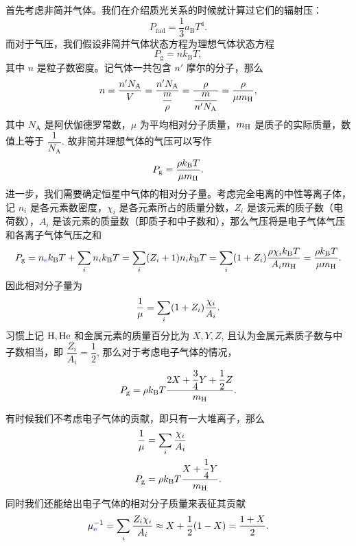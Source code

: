 \documentclass[../天体物理基础.tex]{subfiles}
\begin{document}
首先考虑非简并气体。我们在介绍质光关系的时候就计算过它们的辐射压：
\begin{equation}
P_{\mathrm{rad}}=\frac{1}{3}a_{\mathrm{B}}T^{4}.
\end{equation}
而对于气压，我们假设非简并气体状态方程为理想气体状态方程
\begin{equation}
P_{\mathrm{g}}=n{}k_{\mathrm{B}}T,
\end{equation}
其中 $n$ 是粒子数密度。记气体一共包含 $n'$ 摩尔的分子，那么
\begin{equation}
n=\frac{n'N_{\mathrm{A}}}{V}=\frac{n'N_{\mathrm{A}}}{\dfrac{m}{\rho}}=\frac{\rho}{\dfrac{m}{n'N_{\mathrm{A}}}}=\frac{\rho}{\mu m_{\ce{H}}},
\end{equation}
其中 $N_{\mathrm{A}}$ 是阿伏伽德罗常数，$\mu$ 为平均相对分子质量，$m_{\ce{H}}$ 是质子的实际质量，数值上等于 $\dfrac{1}{N_{\mathrm{A}}}$. 故非简并理想气体的气压可以写作
\begin{equation}
P_{\mathrm{g}}=\frac{\rho{}k_{\mathrm{B}}T}{\mu m_{\ce{H}}}.
\end{equation}
进一步，我们需要确定恒星中气体的相对分子量。考虑完全电离的中性等离子体，记 $n_{i}$ 是各元素数密度，$\chi_{i}$ 是各元素所占的质量分数，$Z_{i}$ 是该元素的质子数（电荷数），$A_{i}$ 是该元素的质量数（即质子和中子数和），那么气压将是电子气体气压和各离子气体气压之和
\begin{equation}
P_{\mathrm{g}}=n_{{\color{blue}{\ce{e}}}}k_{\mathrm{B}}T+\sum_{i}n_{i}k_{\mathrm{B}}T=\sum_{i}\mleft(Z_{i}+1\mright) n_{i}k_{\mathrm{B}}T=\sum_{i}\mleft(1+Z_{i}\mright)\frac{\rho\chi_{i}k_{\mathrm{B}}T}{A_{i}m_{\ce{H}}}=\frac{\rho{}k_{\mathrm{B}}T}{\mu m_{\ce{H}}}.
\end{equation}
因此相对分子量为
\begin{equation}
\frac{1}{\mu}=\sum_{i}\mleft(1+Z_{i}\mright)\frac{\chi_{i}}{A_{i}}.
\end{equation}
习惯上记 $\ce{H},\ce{He}$ 和金属元素的质量百分比为 $X, Y, Z$, 且认为金属元素质子数与中子数相当，即 $\dfrac{Z_{i}}{A_{i}}=\dfrac{1}{2}$, 那么对于考虑电子气体的情况，
\begin{equation}
P_{\mathrm{g}}=\rho{}k_{\mathrm{B}}T\frac{2X+\dfrac{3}{4}Y+\dfrac{1}{2}Z}{m_{\ce{H}}}.
\end{equation}

有时候我们不考虑电子气体的贡献，即只有一大堆离子，那么
\begin{align}
\frac{1}{\mu}&=\sum_{i}\frac{\chi_{i}}{A_{i}}\\
P_{\mathrm{g}}&=\rho{}k_{\mathrm{B}}T\frac{X+\dfrac{1}{4}Y}{m_{\ce{H}}}.
\end{align}
同时我们还能给出电子气体的相对分子质量来表征其贡献
\begin{equation}
\mu_{{\color{blue}{\ce{e}}}}^{-1}=\sum_{i}\frac{Z_{i}\chi_{i}}{A_{i}}\approx X+\frac{1}{2}\mleft(1-X\mright)=\frac{1+X}{2}.
\end{equation}
\end{document}
